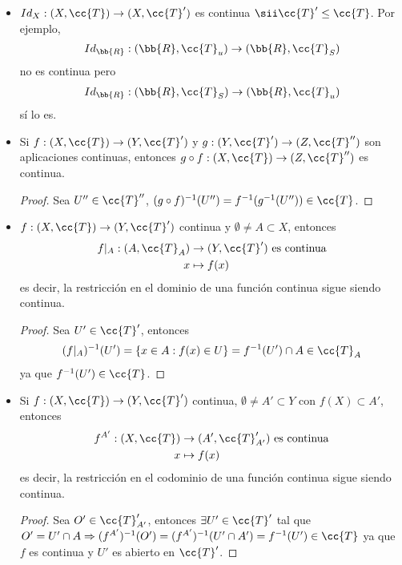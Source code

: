 \begin{observacion}
\begin{itemize}
        \item $Id_X : (X, \cc{T}) \to (X, \cc{T}')$ es continua $\sii \cc{T}' \leq \cc{T}$. Por ejemplo, 
        \begin{align*}
            Id_{\bb{R}}:(\bb{R}, \cc{T}_u)\to (\bb{R}, \cc{T}_S)
        \end{align*}
        no es continua pero
        \begin{align*}
            Id_{\bb{R}}:(\bb{R}, \cc{T}_S) \to (\bb{R}, \cc{T}_u)
        \end{align*} 
        sí lo es.
        \item Si $f:(X, \cc{T})\to (Y, \cc{T}')$ y $g:(Y, \cc{T}')\to (Z, \cc{T}'')$ son aplicaciones continuas, entonces $g\circ f : (X, \cc{T})\to (Z, \cc{T}'')$ es continua.
        \begin{proof}
            Sea $U''\in \cc{T}''$, $(g\circ f)^{-1}(U'') = f^{-1}(g^{-1}(U''))\in \cc{T}$.
        \end{proof}
        \item $f:(X, \cc{T})\to (Y,\cc{T}')$ continua y $\emptyset\neq A  \subset X$, entonces
        \begin{align*}
            f|_{A}:(A, \cc{T}_A) &\to (Y, \cc{T}') \text{ es continua}\\
            x & \mapsto f(x)
        \end{align*}
        es decir, la restricción en el dominio de una función continua sigue siendo continua.
        \begin{proof}
            Sea $U'\in \cc{T}'$, entonces 
            \begin{align*}
                (f|_{A})^{-1}(U') = \{x \in A : f(x)\in U\} = f^{-1}(U') \cap A\in \cc{T}_A
            \end{align*}
            ya que $f^{-1}(U')\in \cc{T}$.
        \end{proof}
        \item Si $f:(X, \cc{T})\to (Y, \cc{T}')$ continua, $\emptyset \neq A' \subset Y$ con $f(X)\subset A'$, entonces 
        \begin{align*}
            f^{A'}:(X, \cc{T}) &\to (A', \cc{T}_{A'}') \text{ es continua}\\
            x &\mapsto f(x)
        \end{align*}
        es decir, la restricción en el codominio de una función continua sigue siendo continua.
        \begin{proof}
            Sea $O'\in \cc{T}_{A'}'$, entonces $\exists U'\in \cc{T}'$ tal que  $O'=U'\cap A \Rightarrow (f^{A'})^{-1}(O') = (f^{A'})^{-1}(U'\cap A') = f^{-1}(U')\in \cc{T}$ ya que $f$ es continua y $U'$ es abierto en $\cc{T}'$.

        \end{proof}
    \end{itemize}
\end{observacion}

